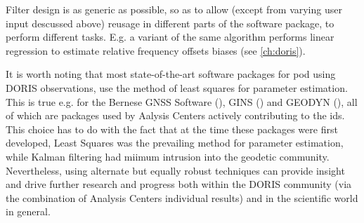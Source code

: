Filter design is as generic as possible, so as to allow (except from varying user 
input descussed above) reusage in different parts of the software package, to perform 
different tasks. E.g. a variant of the same algorithm performs linear regression 
to estimate relative frequency offsets biases (see \autoref{ch:doris}).

It is worth noting that most state-of-the-art software packages for \gls{pod} using 
DORIS observations, use the method of least squares for parameter estimation. This 
is true e.g. for the Bernese GNSS Software (\cite{Dach2015}), GINS (\cite{Gins2013}) and 
GEODYN (\cite{Geodyn2015}), all of which are packages used by Aalysis Centers 
actively contributing to the \gls{ids}. This choice has to do with the fact that 
at the time these packages were first developed, Least Squares was the prevailing 
method for parameter estimation, while Kalman filtering had miimum intrusion into the 
geodetic community. Nevertheless, using alternate but equally robust techniques 
can provide insight and drive further research and progress both within the DORIS 
community (via the combination of Analysis Centers individual results) and in the 
scientific world in general.

